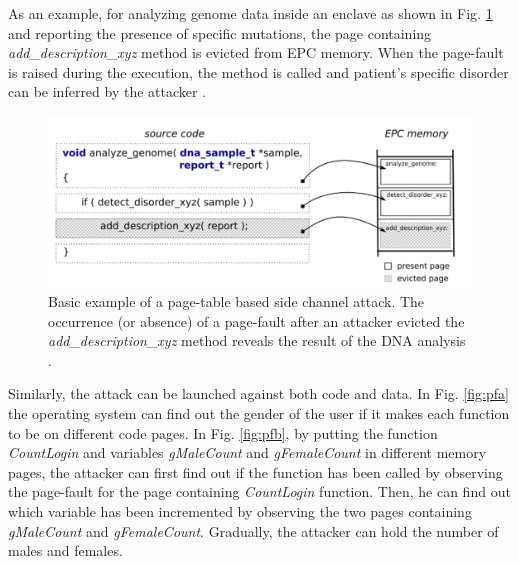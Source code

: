 As an example, for analyzing genome data inside an enclave as shown in Fig. \ref{fig:pfdna} and reporting the presence of specific mutations, the page containing \emph{add\_description\_xyz} method is evicted from EPC memory. When the page-fault is raised during the execution, the method is called and patient's specific disorder can be inferred by the attacker \cite{heisenberg}.

\begin{figure}
	\includegraphics[scale=0.25]{images/pfdna}
	\caption{Basic example of a page-table based side channel attack. The occurrence (or absence) of a page-fault after an attacker evicted the \emph{add\_description\_xyz} method reveals	the result of the DNA analysis \cite{heisenberg}.}
	\label{fig:pfdna}
\end{figure}

Similarly, the attack can be launched against both code and data. In Fig. \ref{fig:pfa} the operating system can find out the gender of the user if it makes each function to be on different code pages. In Fig. \ref{fig:pfb}, by putting the function \emph{CountLogin} and variables \emph{gMaleCount} and \emph{gFemaleCount} in different memory pages, the attacker can first find out if the function has been called by observing the page-fault for the page containing \emph{CountLogin} function. Then, he can find out which variable has been incremented by observing the two pages containing \emph{gMaleCount} and \emph{gFemaleCount}. Gradually, the attacker can hold the number of males and females.

